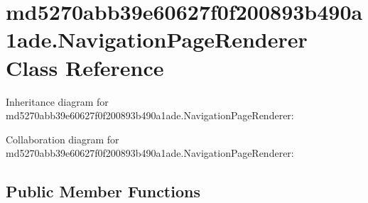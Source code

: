 \hypertarget{classmd5270abb39e60627f0f200893b490a1ade_1_1_navigation_page_renderer}{}\section{md5270abb39e60627f0f200893b490a1ade.\+Navigation\+Page\+Renderer Class Reference}
\label{classmd5270abb39e60627f0f200893b490a1ade_1_1_navigation_page_renderer}


Inheritance diagram for md5270abb39e60627f0f200893b490a1ade.\+Navigation\+Page\+Renderer\+:


Collaboration diagram for md5270abb39e60627f0f200893b490a1ade.\+Navigation\+Page\+Renderer\+:
\subsection*{Public Member Functions}
